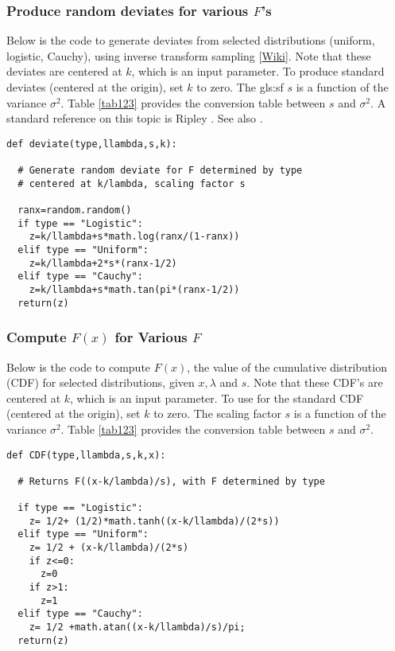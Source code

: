 \documentclass[10pt]{article}
\begin{document}
\subsubsection{Produce random deviates for various $F$'s} \label{deviates}
Below is the code to generate \textcolor{index}{deviates} from selected distributions (\textcolor{index}{uniform}, \textcolor{index}{logistic}, \textcolor{index}{Cauchy}), using \textcolor{index}{inverse transform sampling} [\href{https://en.wikipedia.org/wiki/Inverse_transform_sampling}{Wiki}]. Note that these deviates are centered at $k$, which is an input parameter. To produce standard deviates (centered at the origin), set $k$ to zero. The \gls{gls:sf} $s$ is a function of the variance $\sigma^2$. Table \ref{tab123} provides the conversion table between $s$ and $\sigma^2$. A standard reference on this topic is Ripley \cite{ripley}. See also \cite{hbsimul}.

\begin{lstlisting}
def deviate(type,llambda,s,k):

  # Generate random deviate for F determined by type
  # centered at k/lambda, scaling factor s

  ranx=random.random()
  if type == "Logistic":
    z=k/llambda+s*math.log(ranx/(1-ranx))
  elif type == "Uniform":
    z=k/llambda+2*s*(ranx-1/2)
  elif type == "Cauchy":
    z=k/llambda+s*math.tan(pi*(ranx-1/2))
  return(z)
\end{lstlisting}
\subsubsection{Compute $F(x)$ for Various $F$}\label{scdf}
Below is the code to compute $F(x)$, the value of the cumulative distribution (CDF) for selected distributions, given $x, \lambda$ and $s$. Note that these CDF's are centered at $k$, which is an input parameter. To use for the standard CDF (centered at the origin), set $k$ to zero. The scaling factor $s$ is a function of the variance $\sigma^2$. Table \ref{tab123} provides the conversion table between $s$ and $\sigma^2$.

\begin{lstlisting}
def CDF(type,llambda,s,k,x):

  # Returns F((x-k/lambda)/s), with F determined by type

  if type == "Logistic":
    z= 1/2+ (1/2)*math.tanh((x-k/llambda)/(2*s))
  elif type == "Uniform":
    z= 1/2 + (x-k/llambda)/(2*s)
    if z<=0:
      z=0
    if z>1:
      z=1
  elif type == "Cauchy":
    z= 1/2 +math.atan((x-k/llambda)/s)/pi;
  return(z)
\end{lstlisting}
\end{document}
